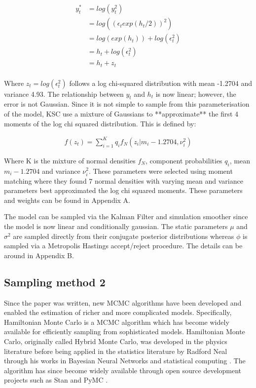 \documentclass[12pt, a4paper]{article}
\begin{document}
        $$
        \begin{aligned}
        y_t^{*} &= log(y_t^2) \\ 
        &= log((\epsilon_t exp(h_t/2))^2) \\
        &=  log(exp(h_t)) + log(\epsilon_t^2) \\
        &= h_t + log(\epsilon_t^2)  \\
        &= h_t + z_t \\
        \end{aligned}
        $$

        Where $z_t = log(\epsilon_t^2)$ follows a log chi-squared distribution with mean -1.2704 and variance 4.93. The relationship between $y_t$ and $h_t$ is now linear; however, the error is not Gaussian. Since it is not simple to sample from this parameterisation of the model, KSC use a mixture of Gaussians to **approximate** the first 4 moments of the log chi squared distribution. This is defined by:

        $$
        \begin{aligned}
        f(z_t) = \sum_{i=1}^{K} q_if_N(z_i|m_i-1.2704, \nu_i^2)
        \end{aligned}
        $$

        Where K is the mixture of normal densities $f_N$, component probabilities $q_i$, mean $m_i-1.2704$ and variance $\nu_i^2$. These parameters were selected using moment matching where they found 7 normal densities with varying mean and variance parameters best approximated the log chi squared moments. These parameters and weights can be found in Appendix A.

        The model can be sampled via the Kalman Filter and simulation smoother since the model is now linear and conditionally gaussian. The static parameters $\mu$ and $\sigma^2$ are sampled directly from their conjugate posterior distributions whereas $\phi$ is sampled via a Metropolis Hastings accept/reject procedure. The details can be around in Appendix B. 

    \subsection{Sampling method 2}
        Since the paper was written, new MCMC algorithms have been developed and enabled the estimation of richer and more complicated models. Specifically, Hamiltonian Monte Carlo is a MCMC algorithm which has become widely available for efficiently sampling from sophisticated models. Hamiltonian Monte Carlo, originally called Hybrid Monte Carlo, was developed in the physics literature \citep{duane1987hybrid} before being applied in the statistics literature by Radford Neal through his works in Bayesian Neural Networks \citep{neal1995bayesian} and statistical computing \citep{neal2011mcmc}. The algorithm has since become widely available through open source development projects such as Stan \citep{stan} and PyMC \citep{pymc2023}.
\end{document}
